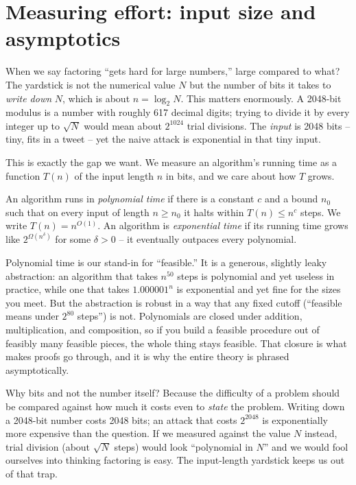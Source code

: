 \section{Measuring effort: input size and asymptotics}
\label{ch08:size}

When we say factoring ``gets hard for large numbers,'' large compared to what? The yardstick is not the numerical value $N$ but the number of bits it takes to \emph{write down} $N$, which is about $n = \log_2 N$. This matters enormously. A 2048-bit modulus is a number with roughly 617 decimal digits; trying to divide it by every integer up to $\sqrt N$ would mean about $2^{1024}$ trial divisions. The \emph{input} is 2048 bits -- tiny, fits in a tweet -- yet the naive attack is exponential in that tiny input.

This is exactly the gap we want. We measure an algorithm's running time as a function $T(n)$ of the input length $n$ in bits, and we care about how $T$ grows.

\begin{definition}
\label{ch08:def-polytime}
An algorithm runs in \emph{polynomial time} if there is a constant $c$ and a bound $n_0$ such that on every input of length $n \ge n_0$ it halts within $T(n) \le n^{c}$ steps. We write $T(n) = n^{O(1)}$. An algorithm is \emph{exponential time} if its running time grows like $2^{\Omega(n^{\delta})}$ for some $\delta > 0$ -- it eventually outpaces every polynomial.
\end{definition}

Polynomial time is our stand-in for ``feasible.'' It is a generous, slightly leaky abstraction: an algorithm that takes $n^{50}$ steps is polynomial and yet useless in practice, while one that takes $1.000001^{n}$ is exponential and yet fine for the sizes you meet. But the abstraction is robust in a way that any fixed cutoff (``feasible means under $2^{80}$ steps'') is not. Polynomials are closed under addition, multiplication, and composition, so if you build a feasible procedure out of feasibly many feasible pieces, the whole thing stays feasible. That closure is what makes proofs go through, and it is why the entire theory is phrased asymptotically.

\begin{intuitionbox}
Why bits and not the number itself? Because the difficulty of a problem should be compared against how much it costs even to \emph{state} the problem. Writing down a 2048-bit number costs 2048 bits; an attack that costs $2^{2048}$ is exponentially more expensive than the question. If we measured against the value $N$ instead, trial division (about $\sqrt N$ steps) would look ``polynomial in $N$'' and we would fool ourselves into thinking factoring is easy. The input-length yardstick keeps us out of that trap.
\end{intuitionbox}

